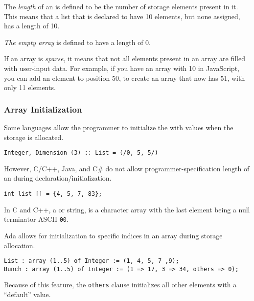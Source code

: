 \begin{definition}[Length]\label{def:Array-Length}
  The \emph{length} of an  is defined to be the number of storage elements present in it.
  This means that a list that is declared to have 10 elements, but none assigned, has a length of 10.

  \begin{remark}\label{rmk:Array-Length-Empty_Array}
    \emph{The empty array} is defined to have a length of 0.
  \end{remark}
\end{definition}

\begin{definition}[Sparse]\label{def:Array-Sparse}
  If an array is \emph{sparse}, it means that not all elements present in an array are filled with user-input data.
  For example, if you have an array with  10 in JavaScript, you can add an element to position 50, to create an array that now has  51, with only 11 elements.
\end{definition}

\subsubsection{Array Initialization}\label{subsubsec:Arrays-Initialization}
Some languages allow the programmer to initialize the  with values when the storage is allocated.
\begin{verbatim}
Integer, Dimension (3) :: List = (/0, 5, 5/)
\end{verbatim}
However, C/C++, Java, and C\# do not allow programmer-specification length of an  during declaration/initialization.
\begin{verbatim}
int list [] = {4, 5, 7, 83};
\end{verbatim}

In C and C++, a  or string, is a character array with the last element being a null terminator ASCII \texttt{00}.

Ada allows for initialization to specific indices in an array during storage allocation.
\begin{verbatim}
List : array (1..5) of Integer := (1, 4, 5, 7 ,9);
Bunch : array (1..5) of Integer := (1 => 17, 3 => 34, others => 0);
\end{verbatim}
Because of this feature, the \texttt{others} clause initializes all other elements with a ``default'' value.

